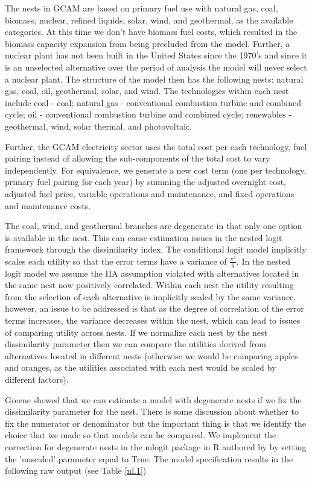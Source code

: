 \documentclass[10pt]{amsart}
\begin{document}
The nests in GCAM are based on primary fuel use with natural gas, coal, biomass, nuclear, refined liquids, solar, wind, and geothermal, as the available categories.
At this time we don't have biomass fuel costs, which resulted in the biomass capacity expansion from being precluded from the model.
Further, a nuclear plant has not been built in the United States since the 1970's and since it is an unselected  alternative over the period of analysis the model will never select a nuclear plant. 
The structure of the model then has the following nests: natural gas, coal, oil, geothermal, solar, and wind. 
The technologies within each nest include coal - coal; natural gas - conventional combustion turbine and combined cycle; oil - conventional combustion turbine and combined cycle; renewables - geothermal, wind, solar thermal, and photovoltaic. 

Further, the GCAM electricity sector uses the total cost per each technology, fuel pairing instead of allowing the sub-components of the total cost to vary independently.
For equivalence, we generate a new cost term (one per technology, primary fuel pairing for each year) by summing the adjusted overnight cost, adjusted fuel price, variable operations and maintenance, and fixed operations and maintenance costs.

The coal, wind, and geothermal branches are degenerate in that only one option is available in the nest.
This can cause estimation issues in the nested logit framework through the dissimilarity index.
The conditional logit model implicitly scales each utility so that the error terms have a variance of $\frac{\pi^2}{6}$.
In the nested logit model we assume the IIA assumption violated with alternatives located in the same nest now positively correlated.
Within each nest the utility resulting from the selection of each alternative is implicitly scaled by the same variance, however, an issue to be addressed is that as the degree of correlation of the error terms increases, the variance decreases within the nest, which can lead to issues of comparing utility across nests.
If we normalize each nest by the nest dissimilarity parameter then we can compare the utilities derived from alternatives located in different nests (otherwise we would be comparing apples and oranges, as the utilities associated with each nest would be scaled by different factors)\parencite{heiss2002structural}.

Greene showed that we can estimate a model with degenerate nests if we fix the dissimilarity parameter for the nest.
There is some discussion about whether to fix the numerator or denominator \parencite{} but the important thing is that we identify the choice that we made so that models can be compared. 
We implement the correction for degenerate nests in the mlogit package in R authored by \cite{mlogit2013} by setting the 'unscaled' parameter equal to True. 
The model specification results in the following raw output (see Table \ref{nl.1})
\end{document}
